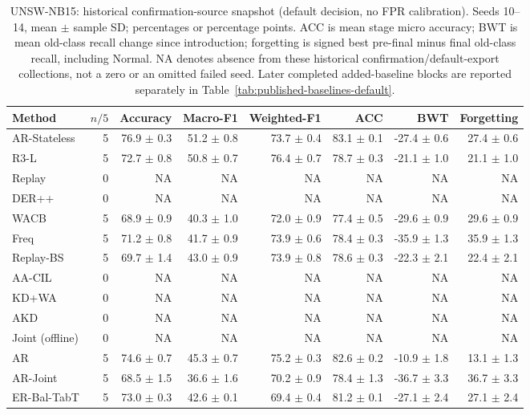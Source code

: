 \begin{table}[t]\centering\scriptsize
\caption{UNSW-NB15: historical confirmation-source snapshot (default decision, no FPR calibration). Seeds 10--14, mean $\pm$ sample SD; percentages or percentage points. ACC is mean stage micro accuracy; BWT is mean old-class recall change since introduction; forgetting is signed best pre-final minus final old-class recall, including Normal. NA denotes absence from these historical confirmation/default-export collections, not a zero or an omitted failed seed. Later completed added-baseline blocks are reported separately in Table~\ref{tab:published-baselines-default}.}
\label{tab:default-unsw}
\begin{tabular}{lrrrrrrr}\toprule
Method & $n/5$ & Accuracy & Macro-F1 & Weighted-F1 & ACC & BWT & Forgetting \\\midrule
AR-Stateless & 5 & 76.9 $\pm$ 0.3 & 51.2 $\pm$ 0.8 & 73.7 $\pm$ 0.4 & 83.1 $\pm$ 0.1 & -27.4 $\pm$ 0.6 & 27.4 $\pm$ 0.6 \\
R3-L & 5 & 72.7 $\pm$ 0.8 & 50.8 $\pm$ 0.7 & 76.4 $\pm$ 0.7 & 78.7 $\pm$ 0.3 & -21.1 $\pm$ 1.0 & 21.1 $\pm$ 1.0 \\
Replay & 0 & NA & NA & NA & NA & NA & NA \\
DER++ & 0 & NA & NA & NA & NA & NA & NA \\
WACB & 5 & 68.9 $\pm$ 0.9 & 40.3 $\pm$ 1.0 & 72.0 $\pm$ 0.9 & 77.4 $\pm$ 0.5 & -29.6 $\pm$ 0.9 & 29.6 $\pm$ 0.9 \\
Freq & 5 & 71.2 $\pm$ 0.8 & 41.7 $\pm$ 0.9 & 73.9 $\pm$ 0.6 & 78.4 $\pm$ 0.3 & -35.9 $\pm$ 1.3 & 35.9 $\pm$ 1.3 \\
Replay-BS & 5 & 69.7 $\pm$ 1.4 & 43.0 $\pm$ 0.9 & 73.9 $\pm$ 0.8 & 78.6 $\pm$ 0.3 & -22.3 $\pm$ 2.1 & 22.4 $\pm$ 2.1 \\
AA-CIL & 0 & NA & NA & NA & NA & NA & NA \\
KD+WA & 0 & NA & NA & NA & NA & NA & NA \\
AKD & 0 & NA & NA & NA & NA & NA & NA \\
Joint (offline) & 0 & NA & NA & NA & NA & NA & NA \\
AR & 5 & 74.6 $\pm$ 0.7 & 45.3 $\pm$ 0.7 & 75.2 $\pm$ 0.3 & 82.6 $\pm$ 0.2 & -10.9 $\pm$ 1.8 & 13.1 $\pm$ 1.3 \\
AR-Joint & 5 & 68.5 $\pm$ 1.5 & 36.6 $\pm$ 1.6 & 70.2 $\pm$ 0.9 & 78.4 $\pm$ 1.3 & -36.7 $\pm$ 3.3 & 36.7 $\pm$ 3.3 \\
ER-Bal-TabT & 5 & 73.0 $\pm$ 0.3 & 42.6 $\pm$ 0.1 & 69.4 $\pm$ 0.4 & 81.2 $\pm$ 0.1 & -27.1 $\pm$ 2.4 & 27.1 $\pm$ 2.4 \\
\bottomrule\end{tabular}\end{table}
